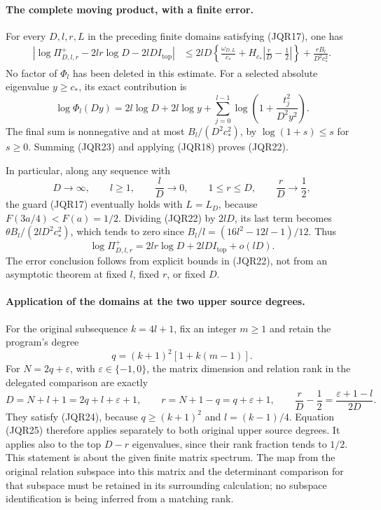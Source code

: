 \paragraph{The complete moving product, with a finite error.}
For every \(D,l,r,L\) in the preceding finite domains satisfying
(JQR17), one has
\[
 \begin{split}
 \left|\log\Pi^+_{D,l,r}
       -2lr\log D-2lD I_{\mathrm{top}}\right|
 &\leq 2lD\left\{\frac{\omega_{D,L}}{c_*}+
           H_{c_*}\left|\frac rD-\frac12\right|\right\}
       +\frac{rB_l}{D^2c_*^2}.
 \end{split}
 \tag{JQR22}
\]
No factor of \(\Phi_l\) has been deleted in this estimate.
For a selected absolute eigenvalue \(y\geq c_*\), its exact contribution
is
\[
 \log\Phi_l(Dy)
 =2l\log D+2l\log y+
    \sum_{j=0}^{l-1}\log\left(1+\frac{t_j^2}{D^2y^2}\right).
 \tag{JQR23}
\]
The final sum is nonnegative and at most \(B_l/(D^2c_*^2)\), by
\(\log(1+s)\leq s\) for \(s\geq0\).  Summing (JQR23) and applying
(JQR18) proves (JQR22).

In particular, along any sequence with
\[
 D\longrightarrow\infty,\qquad
 l\geq1,\qquad \frac lD\longrightarrow0,\qquad
 1\leq r\leq D,\qquad \frac rD\longrightarrow\frac12,
 \tag{JQR24}
\]
the guard (JQR17) eventually holds with \(L=L_D\), because
\(F(3a/4)<F(a)=1/2\).
Dividing (JQR22) by \(2lD\), its last term becomes
\(\theta B_l/(2lD^2c_*^2)\), which tends to zero since
\(B_l/l=(16l^2-12l-1)/12\).
Thus
\[
 \boxed{\displaystyle
 \log\Pi^+_{D,l,r}
     =2lr\log D+2lD I_{\mathrm{top}}+o(lD).}
 \tag{JQR25}
\]
The error conclusion follows from explicit bounds in (JQR22), not
from an asymptotic theorem at fixed \(l\), fixed \(r\), or fixed \(D\).

\paragraph{Application of the domains at the two upper source degrees.}
For the original subsequence \(k=4l+1\), fix an integer \(m\geq1\)
and retain the program's degree
\[
 q=(k+1)^2[1+k(m-1)].
 \tag{JQR26}
\]
For \(N=2q+\varepsilon\), with
\(\varepsilon\in\{-1,0\}\), the matrix dimension and relation rank
in the delegated comparison are exactly
\[
 D=N+l+1=2q+l+\varepsilon+1,\qquad
 r=N+1-q=q+\varepsilon+1,\qquad
 \frac rD-\frac12=\frac{\varepsilon+1-l}{2D}.
 \tag{JQR27}
\]
They satisfy (JQR24), because \(q\geq(k+1)^2\) and
\(l=(k-1)/4\).  Equation (JQR25) therefore applies separately to
both original upper source degrees.  It applies also to the top
\(D-r\) eigenvalues, since their rank fraction tends to \(1/2\).
This statement is about the given finite matrix spectrum.  The map
from the original relation subspace into this matrix and the determinant
comparison for that subspace must be retained in its surrounding
calculation; no subspace identification is being inferred from a
matching rank.

